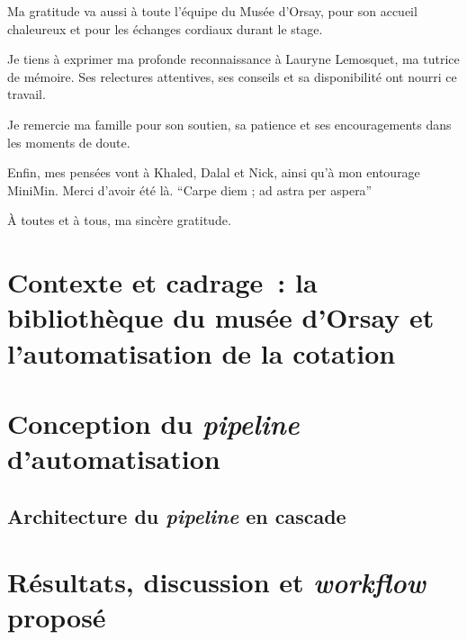 \documentclass[12pt,twoside]{book}
\begin{document}
Ma gratitude va aussi à toute l'équipe du Musée d'Orsay, pour son accueil chaleureux et pour les échanges cordiaux durant le stage.\newline

Je tiens à exprimer ma profonde reconnaissance à Lauryne Lemosquet, ma tutrice de mémoire. Ses relectures attentives, ses conseils  et sa disponibilité ont nourri ce travail.\newline

Je remercie ma famille pour son soutien, sa patience et ses encouragements dans les moments de doute.\newline

Enfin, mes pensées vont à Khaled, Dalal et Nick, ainsi qu'à mon entourage MiniMin. Merci d'avoir été là.
\enquote{Carpe diem ; ad astra per aspera}

À toutes et à tous, ma sincère gratitude.
	\newpage{\pagestyle{empty}\cleardoublepage}

	

\nocite{*}
\printbibliography[keyword=classification, title={Classification LCC, DDC et RAMEAU}]
\printbibliography[keyword=ia-catalogage, title={Intelligence artificielle appliquée au catalogage}]
\printbibliography[keyword=llm-comportement, title={Comportement des modèles de langage}]
\printbibliography[keyword=methodologie, title={Méthodologie statistique}]
\printbibliography[keyword=terrain, title={Sources de terrain (BM'O)}]



\mainmatter

\part{Contexte et cadrage~: la bibliothèque du musée d'Orsay et l'automatisation de la cotation}


\part{Conception du \textit{pipeline} d'automatisation}
\chapter{Architecture du \textit{pipeline} en cascade}


\part{Résultats, discussion et \textit{workflow} proposé}

\end{document}
